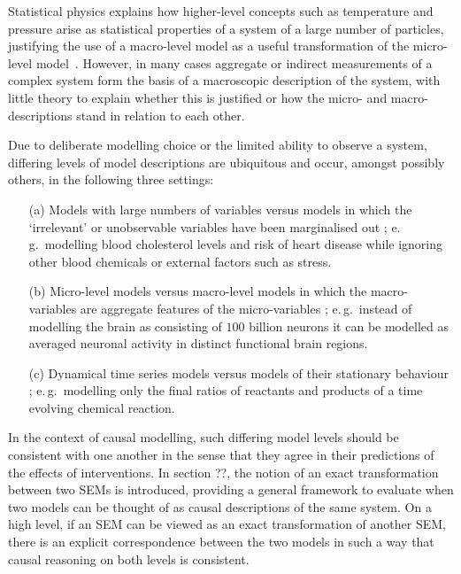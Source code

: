 Statistical physics explains how higher-level concepts such as temperature and pressure arise as statistical properties of a system of a large number of particles, justifying the use of a macro-level model as a useful transformation of the micro-level model~\citep{Balian}.
However, in many cases aggregate or indirect measurements of a complex system form the basis of a macroscopic description of the system, with little theory to explain whether this is justified or how the micro- and macro-descriptions stand in relation to each other.

Due to deliberate modelling choice or the limited ability to observe a system, differing levels of model descriptions are ubiquitous and occur, amongst possibly others, in the following three settings:

\begin{itemize}[noitemsep]
	\item[(a)] Models with large numbers of variables versus models in which the `irrelevant' or unobservable variables have been marginalised out \citep{bongers2016structural}; e.\,g.\ modelling blood cholesterol levels and risk of heart disease while ignoring other blood chemicals or external factors such as stress.
	
	\item[(b)] Micro-level models versus macro-level models in which the macro-variables are aggregate features of the micro-variables \citep{simon1961aggregation,iwasaki1994causality,hoel2013quantifying,chalupka2015visual,chalupka2016multi}; e.\,g.\ instead of modelling the brain as consisting of $100$ billion neurons it can be modelled as averaged neuronal activity in distinct functional brain regions.
	
	\item[(c)] Dynamical time series models versus models of their stationary behaviour \citep{fisher1970correspondence,iwasaki1994causality,dash2001caveats,lacerda2012discovering,mooij2013ode,mooij2013cyclic}; e.\,g.\ modelling only the final ratios of reactants and products of a time evolving chemical reaction.
\end{itemize}

In the context of causal modelling, such differing model levels should be consistent with one another in the sense that they agree in their predictions of the effects of interventions. 
In section ??, the notion of an exact transformation between two SEMs is introduced, providing a general framework to evaluate when two models can be thought of as causal descriptions of the same system.
On a high level, if an SEM can be viewed as an exact transformation of another SEM, there is an explicit correspondence between the two models in such a way that causal reasoning on both levels is consistent.


